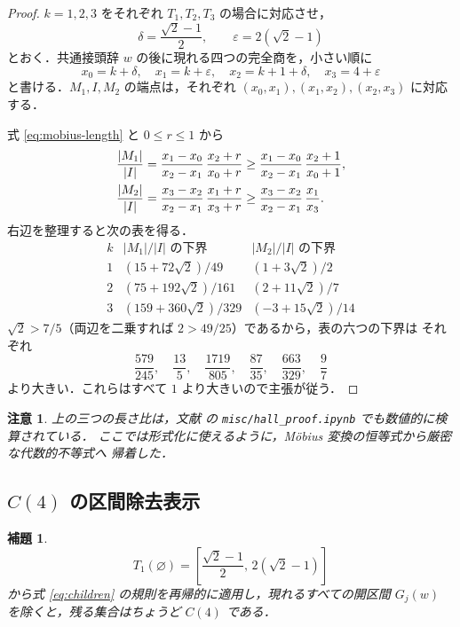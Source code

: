 \documentclass[10pt,a4paper]{ujarticle}
\newtheorem{lemma}[theorem]{補題}
\newtheorem{remark}[theorem]{注意}
\newcommand{\length}[1]{\lvert #1\rvert}
\begin{document}
\begin{proof}
$k=1,2,3$ をそれぞれ $T_1,T_2,T_3$ の場合に対応させ，
\[
  \delta=\frac{\sqrt2-1}{2},\qquad
  \varepsilon=2(\sqrt2-1)
\]
とおく．共通接頭辞 $w$ の後に現れる四つの完全商を，小さい順に
\[
  x_0=k+\delta,\quad
  x_1=k+\varepsilon,\quad
  x_2=k+1+\delta,\quad
  x_3=4+\varepsilon
\]
と書ける．$M_1,I,M_2$ の端点は，それぞれ
$(x_0,x_1),(x_1,x_2),(x_2,x_3)$ に対応する．

式 \eqref{eq:mobius-length} と $0\le r\le1$ から
\begin{align}
\label{eq:length-ratio-bounds}
  \frac{\length{M_1}}{\length I}
  &=
  \frac{x_1-x_0}{x_2-x_1}\,
  \frac{x_2+r}{x_0+r}
  \ge
  \frac{x_1-x_0}{x_2-x_1}\,
  \frac{x_2+1}{x_0+1},\notag\\
  \frac{\length{M_2}}{\length I}
  &=
  \frac{x_3-x_2}{x_2-x_1}\,
  \frac{x_1+r}{x_3+r}
  \ge
  \frac{x_3-x_2}{x_2-x_1}\,
  \frac{x_1}{x_3}.
\end{align}
右辺を整理すると次の表を得る．
\[
\begin{array}{c|c|c}
 k&
 \text{$\length{M_1}/\length I$ の下界}&
 \text{$\length{M_2}/\length I$ の下界}\\ \hline
 1&(15+72\sqrt2)/49&(1+3\sqrt2)/2\\
 2&(75+192\sqrt2)/161&(2+11\sqrt2)/7\\
 3&(159+360\sqrt2)/329&(-3+15\sqrt2)/14
\end{array}
\]
$\sqrt2>7/5$（両辺を二乗すれば $2>49/25$）であるから，表の六つの下界は
それぞれ
\[
  \frac{579}{245},\quad
  \frac{13}{5},\quad
  \frac{1719}{805},\quad
  \frac{87}{35},\quad
  \frac{663}{329},\quad
  \frac97
\]
より大きい．これらはすべて $1$ より大きいので主張が従う．
\end{proof}

\begin{remark}
上の三つの長さ比は，文献 \cite{verify-freiman} の
\texttt{misc/hall\_proof.ipynb} でも数値的に検算されている．
ここでは形式化に使えるように，Möbius 変換の恒等式から厳密な代数的不等式へ
帰着した．
\end{remark}

\subsection{$C(4)$ の区間除去表示}

\begin{lemma}
\label{lemma:C4-construction}
\[
  T_1(\varnothing)
  =
  \left[\frac{\sqrt2-1}{2},\,2(\sqrt2-1)\right]
\]
から式 \eqref{eq:children} の規則を再帰的に適用し，現れるすべての開区間
$G_j(w)$ を除くと，残る集合はちょうど $C(4)$ である．
\end{lemma}
\end{document}
